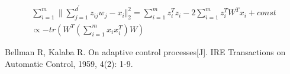 \documentclass[12pt,a4paper]{article}
\begin{document}
\begin{equation}
	\begin{split}
	\sum_{i=1}^{m} \|\sum_{j=1}^{d^{'}}z_{ij}w_j-x_i \Vert_2^2 = \sum_{i=1}^{m}z_i^T z_i - 2\sum_{i=1}^m z_i^T
	W^T x_i + const \\
	\propto -tr(W^T(\sum_{i=1}^m x_i x_i^T)W) \label{1}
	\end{split}
\end{equation}

\newpage
\begin{thebibliography}{99}  
	Bellman R, Kalaba R. On adaptive control processes[J]. IRE Transactions on Automatic Control, 1959, 4(2): 1-9.  
	\end{thebibliography}
\end{document}
